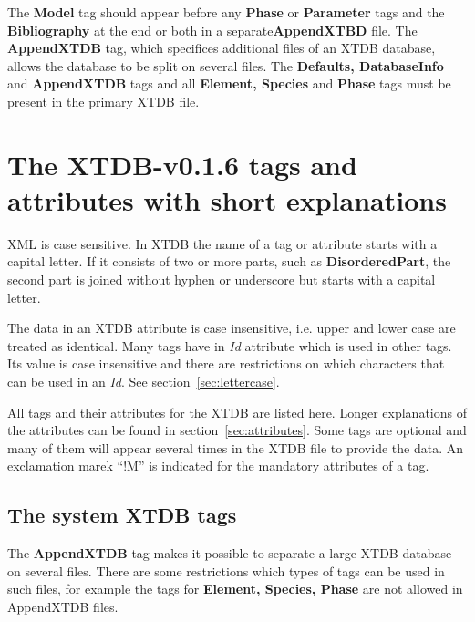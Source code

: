 \documentclass{article}
\begin{document}
The {\bf Model} tag should appear before any {\bf Phase} or {\bf
  Parameter} tags and the {\bf Bibliography} at the end or both in a
separate{\bf AppendXTBD} file.  The {\bf AppendXTDB} tag, which
specifices additional files of an XTDB database, allows the database to
be split on several files.  The {\bf Defaults, DatabaseInfo} and {\bf
  AppendXTDB} tags and all {\bf Element, Species} and {\bf Phase} tags
must be present in the primary XTDB file.

\newpage

\section{The XTDB-v0.1.6 tags and attributes with short explanations}\label{sec:tags}

XML is case sensitive.  In XTDB the name of a tag or attribute starts
with a capital letter.  If it consists of two or more parts, such as
{\bf DisorderedPart}, the second part is joined without hyphen or
underscore but starts with a capital letter.

The data in an XTDB attribute is case insensitive, i.e. upper and
lower case are treated as identical.  Many tags have in {\em Id}
attribute which is used in other tags.  Its value is case insensitive
and there are restrictions on which characters that can be used in an
{\em Id}.  See section~\ref{sec:lettercase}.

All tags and their attributes for the XTDB are listed here. Longer
explanations of the attributes can be found in
section~\ref{sec:attributes}.  Some tags are optional and many of them
will appear several times in the XTDB file to provide the data.  An
exclamation marek ``!M'' is indicated for the mandatory attributes of
a tag.

\subsection{The system XTDB tags}\label{sec:first}

The {\bf AppendXTDB} tag makes it possible to separate a large XTDB
database on several files.  There are some restrictions which types of
tags can be used in such files, for example the tags for {\bf Element,
  Species, Phase} are not allowed in AppendXTDB files.
\end{document}
